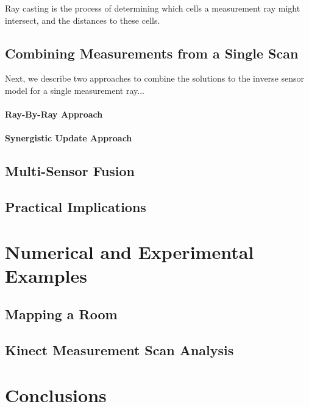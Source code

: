 Ray casting is the process of determining which cells a measurement ray might intersect, and the distances to these cells.

\subsection{Combining Measurements from a Single Scan}

Next, we describe two approaches to combine the solutions to the inverse sensor model for a single measurement ray...

\paragraph{Ray-By-Ray Approach}
\label{sec:RayByRay}

\paragraph{Synergistic Update Approach}
\label{sec:Synergistic}

\subsection{Multi-Sensor Fusion}

\subsection{Practical Implications}

\section{Numerical and Experimental Examples}

\subsection{Mapping a Room}

\subsection{Kinect Measurement Scan Analysis}


\section{Conclusions}

